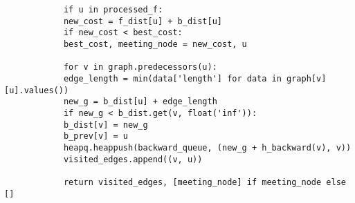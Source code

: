 \begin{appendices}
\begin{lstlisting}
			if u in processed_f:
			new_cost = f_dist[u] + b_dist[u]
			if new_cost < best_cost:
			best_cost, meeting_node = new_cost, u
			
			for v in graph.predecessors(u):
			edge_length = min(data['length'] for data in graph[v][u].values())
			new_g = b_dist[u] + edge_length
			if new_g < b_dist.get(v, float('inf')):
			b_dist[v] = new_g
			b_prev[v] = u
			heapq.heappush(backward_queue, (new_g + h_backward(v), v))
			visited_edges.append((v, u))
			
			return visited_edges, [meeting_node] if meeting_node else []
		\end{lstlisting}
		
	
\end{appendices}